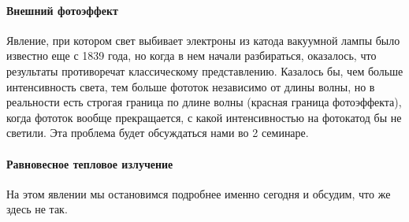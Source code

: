 \documentclass[12pt]{article}
\begin{document}
\paragraph{Внешний фотоэффект} 
Явление, при котором свет выбивает электроны из катода вакуумной лампы было известно еще с 1839 года, но когда в нем начали разбираться, оказалось, что результаты противоречат классическому представлению. Казалось бы, чем больше интенсивность света, тем больше фототок независимо от длины волны, но в реальности есть строгая граница по длине волны (красная граница фотоэффекта), когда фототок вообще прекращается, с какой интенсивностью на фотокатод бы не светили. Эта проблема будет обсуждаться нами во 2 семинаре. 

\paragraph{Равновесное тепловое излучение}
На этом явлении мы остановимся подробнее именно сегодня и обсудим, что же здесь не так.
\end{document}
